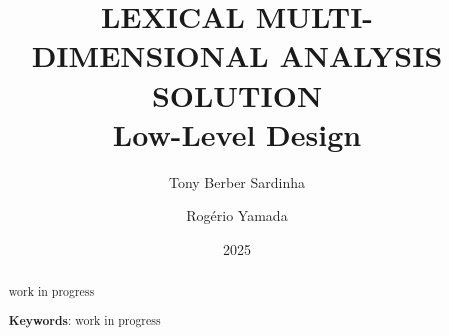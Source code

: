 \title{
    \LARGE \MakeUppercase{Lexical Multi-Dimensional Analysis Solution} \\
    \Large Low-Level Design
}
\author{Tony Berber Sardinha \and Rogério Yamada} %
\date{2025}
\maketitle
\begin{abstract}
    work in progress \citep{biberVariationSpeechWriting1988}

    \vspace{1em}
    \textbf{Keywords}: work in progress
\end{abstract}

\tableofcontents

